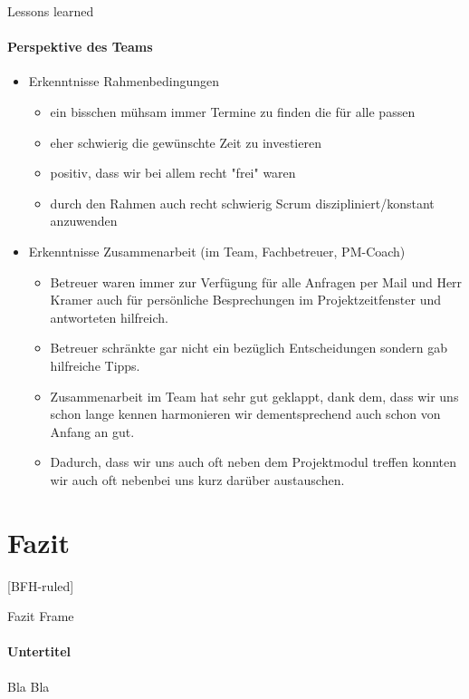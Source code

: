\documentclass[
    ngerman,%
    authorontitle=true,
]{bfhbeamer}
\begin{document}
    \begin{frame}{Lessons learned}
        \framesubtitle{Perspektive des Teams}
        \begin{itemize}
            \item Erkenntnisse Rahmenbedingungen
            \begin{itemize}
                \item ein bisschen mühsam immer Termine zu finden die für alle passen
                \item eher schwierig die gewünschte Zeit zu investieren
                \item positiv, dass wir bei allem recht "frei" waren
                \item durch den Rahmen auch recht schwierig Scrum diszipliniert/konstant anzuwenden
            \end{itemize}
            \item Erkenntnisse Zusammenarbeit (im Team, Fachbetreuer, PM-Coach)
            \begin{itemize}
                \item Betreuer waren immer zur Verfügung für alle Anfragen per Mail und Herr Kramer auch für persönliche Besprechungen im Projektzeitfenster und antworteten hilfreich.
                \item Betreuer schränkte gar nicht ein bezüglich Entscheidungen sondern gab hilfreiche Tipps.
                \item Zusammenarbeit im Team hat sehr gut geklappt, dank dem, dass wir uns schon lange kennen harmonieren wir dementsprechend auch schon von Anfang an gut.
                \item Dadurch, dass wir uns auch oft neben dem Projektmodul treffen konnten wir auch oft nebenbei uns kurz darüber austauschen.
            \end{itemize}
        \end{itemize}
    \end{frame}


    \section{Fazit}\label{sec:fazit}
    [BFH-ruled]
    \frame{\sectionpage}

    \begin{frame}{Fazit Frame}
        \framesubtitle{Untertitel}
        Bla Bla
    \end{frame}
\end{document}
